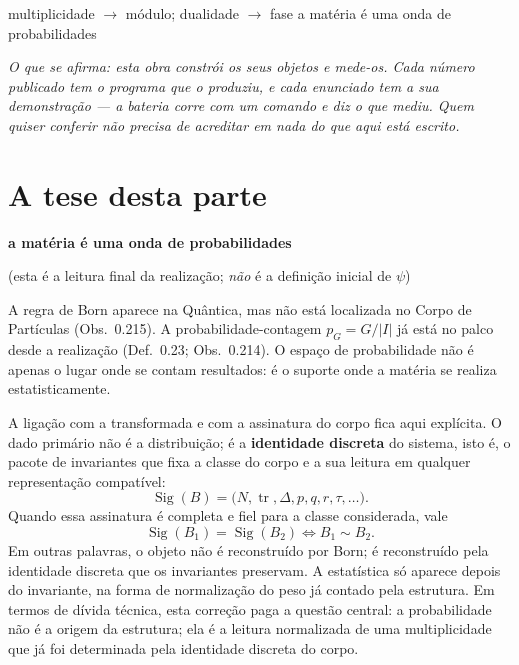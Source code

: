 \documentclass[11pt,a4paper]{article}
\providecommand{\interfacen}[1]{}
\begin{document}
\interfacen{16}
       {multiplicidade $\to$ módulo; dualidade $\to$ fase}
       {a matéria é uma onda de probabilidades}
\maketitle

\begin{center}
\small
\textit{O que se afirma: esta obra constrói os seus objetos e mede-os.
Cada número publicado tem o programa que o produziu, e cada enunciado tem a sua demonstração
--- a bateria corre com um comando e diz o que mediu.
Quem quiser conferir não precisa de acreditar em nada do que aqui está escrito.}
\end{center}

\vspace{1.2em}

\section*{A tese desta parte}

\begin{center}
\large
\textbf{a matéria é uma onda de probabilidades}
\end{center}

\vspace{0.4em}
\begin{center}
\small
(esta é a leitura final da realização; \emph{não} é a definição inicial de $\psi$)
\end{center}

\vspace{0.6em}

A regra de Born aparece na Quântica, mas não está localizada no Corpo de Partículas
(Obs.~0.215). A probabilidade-contagem $p_G=G/|I|$ já está no palco desde a realização
(Def.~0.23; Obs.~0.214). O espaço de probabilidade não é apenas o lugar onde se contam
resultados: é o suporte onde a matéria se realiza estatisticamente.

A ligação com a transformada e com a assinatura do corpo fica aqui explícita. O dado primário
não é a distribuição; é a \textbf{identidade discreta} do sistema, isto é, o pacote de invariantes
que fixa a classe do corpo e a sua leitura em qualquer representação compatível:
\[
\operatorname{Sig}(B)=\bigl(N,\operatorname{tr},\Delta,p,q,r,\tau,\ldots\bigr).
\]
Quando essa assinatura é completa e fiel para a classe considerada, vale
\[
\operatorname{Sig}(B_1)=\operatorname{Sig}(B_2)
\iff
B_1\sim B_2.
\]
Em outras palavras, o objeto não é reconstruído por Born; é reconstruído pela identidade discreta
que os invariantes preservam. A estatística só aparece depois do invariante, na forma de
normalização do peso já contado pela estrutura. Em termos de dívida técnica, esta correção
paga a questão central: a probabilidade não é a origem da estrutura; ela é a leitura normalizada
de uma multiplicidade que já foi determinada pela identidade discreta do corpo.
\end{document}

